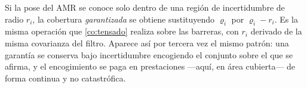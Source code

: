 \begin{observacion}
\label{obs:cobertura-incertidumbre}
Si la pose del AMR se conoce solo dentro de una región de incertidumbre de radio
$r_i$, la cobertura \emph{garantizada} se obtiene sustituyendo $\varrho_i$ por
$\varrho_i-r_i$. Es la misma operación que \cref{co:tensado} realiza sobre las
barreras, con $r_i$ derivado de la misma covarianza del filtro. Aparece así por
tercera vez el mismo patrón: una garantía se conserva bajo incertidumbre
encogiendo el conjunto sobre el que se afirma, y el encogimiento se paga en
prestaciones —aquí, en área cubierta— de forma continua y no catastrófica.
\end{observacion}
